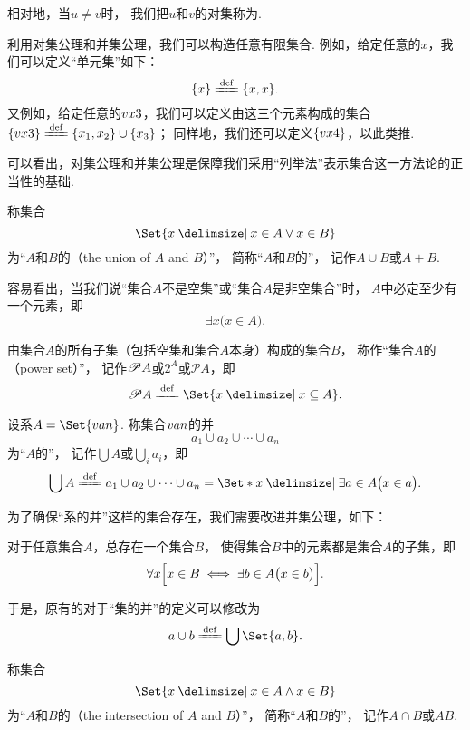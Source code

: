 相对地，当\(u \neq v\)时，
我们把\(u\)和\(v\)的对集称为.

利用对集公理和并集公理，我们可以构造任意有限集合.
例如，给定任意的\(x\)，我们可以定义“单元集”如下：\[
\{x\} \defeq \{x, x\}.
\]
又例如，给定任意的\(v{x}{3}\)，我们可以定义由这三个元素构成的集合
\(\{\v{x}{3}\} \defeq \{x_1,x_2\}\cup\{x_3\}\)；
同样地，我们还可以定义\(\{v{x}{4}\}\)，以此类推.

可以看出，对集公理和并集公理是保障我们采用“列举法”表示集合这一方法论的正当性的基础.


\begin{definition}
称集合\[
	\Set{ x \given x \in A \lor x \in B }
\]为“\(A\)和\(B\)的（the union of \(A\) and \(B\)）”，%
简称“\(A\)和\(B\)的”，%
记作\(A \cup B\)或\(A+B\).
\end{definition}

容易看出，当我们说“集合\(A\)不是空集”或“集合\(A\)是非空集合”时，
\(A\)中必定至少有一个元素，即\[
	\exists x \bigl( x \in A \bigr).
\]


\begin{definition}
由集合\(A\)的所有子集（包括空集和集合\(A\)本身）构成的集合\(B\)，%
称作“集合\(A\)的（power set）”，%
记作\(\mathscr{P} A\)或\(2^A\)或\(\mathcal{P}A\)，即\[
	\Powerset A
	\defeq
	\Set{ x \given x \subseteq A }.
\]
\end{definition}


\begin{definition}
设系\(A = \Set{\v{a}{n}}\).
称集合\(v{a}{n}\)的并\[
	a_1 \cup a_2 \cup \dotsb \cup a_n
\]为“\(A\)的”，
记作\(\bigcup A\)或\(\bigcup\limits_i a_i\)，即\[
	\bigcup A
	\defeq
	a_1 \cup a_2 \cup \dotsb \cup a_n
	= \Set*{ x \given \exists a \in A \bigl( x \in a \bigr) }.
\]
\end{definition}


为了确保“系的并”这样的集合存在，我们需要改进并集公理，如下：
\begin{axiom}[并集公理II]
对于任意集合\(A\)，总存在一个集合\(B\)，%
使得集合\(B\)中的元素都是集合\(A\)的子集，即\[
	\forall x \Bigl[
		x \in B
		\iff
		\exists b \in A \bigl( x \in b \bigr)
	\Bigr].
\]
\end{axiom}

于是，原有的对于“集的并”的定义可以修改为\[
	a \cup b \defeq \bigcup\Set{a,b}.
\]



\begin{definition}
称集合\[
\Set{ x \given x \in A \land x \in B }
\]为“\(A\)和\(B\)的（the intersection of \(A\) and \(B\)）”，%
简称“\(A\)和\(B\)的”，%
记作\(A \cap B\)或\(AB\).
\end{definition}

